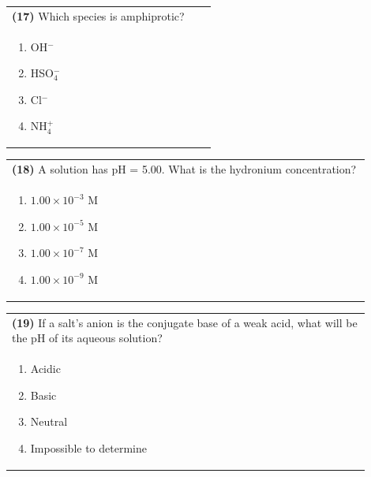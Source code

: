 \documentclass{article}
\begin{document}
\noindent\begin{tabular}{|p{0.9\linewidth}|}
\hline
\textbf{(17)} Which species is amphiprotic? \\[0.2cm]
\begin{minipage}{0.85\linewidth}
\begin{enumerate}[label=\alph*.]
\item OH$^-$ \item HSO$_4^-$ \item Cl$^-$ \item NH$_4^+$
\end{enumerate}
\end{minipage}\\[0.2cm]
\hline
\end{tabular}

\noindent\begin{tabular}{|p{0.9\linewidth}|}
\hline
\textbf{(18)} A solution has pH = 5.00. What is the hydronium concentration? \\[0.2cm]
\begin{minipage}{0.85\linewidth}
\begin{enumerate}[label=\alph*.]
\item $1.00\times10^{-3}$ M \item $1.00\times10^{-5}$ M \item $1.00\times10^{-7}$ M \item $1.00\times10^{-9}$ M
\end{enumerate}
\end{minipage}\\[0.2cm]
\hline
\end{tabular}

\noindent\begin{tabular}{|p{0.9\linewidth}|}
\hline
\textbf{(19)} If a salt's anion is the conjugate base of a weak acid, what will be the pH of its aqueous solution? \\[0.2cm]
\begin{minipage}{0.85\linewidth}
\begin{enumerate}[label=\alph*.]
\item Acidic \item Basic \item Neutral \item Impossible to determine
\end{enumerate}
\end{minipage}\\[0.2cm]
\hline
\end{tabular}
\end{document}
